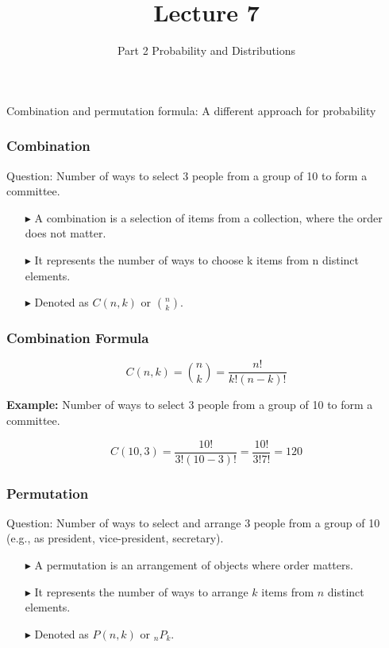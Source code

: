 \documentclass[12pt]{beamer}
\title[ECON2843]{Lecture 7}
\subtitle{Part 2 Probability and Distributions}
\date{}
\begin{document}
	\begin{frame}
		\titlepage
	\end{frame}

	\begin{frame}
	Combination and permutation formula: A different approach for probability
\end{frame}		
		\begin{frame}
			\frametitle{Combination}
			Question: Number of ways to select 3 people from a group of 10 to form a committee.
			
			\begin{itemize}
				\item[\color{blue}$\blacktriangleright$] A combination is a selection of items from a collection, where the order does not matter.
				\item[\color{blue}$\blacktriangleright$] It represents the number of ways to choose k items from n distinct elements.
				\item[\color{blue}$\blacktriangleright$] Denoted as $C(n,k)$ or $\binom{n}{k}$.
			\end{itemize}
			
		\end{frame}
		
		\begin{frame}
			\frametitle{Combination Formula}
			
			\begin{equation*}
				C(n,k) = \binom{n}{k} = \frac{n!}{k!(n-k)!}
			\end{equation*}
			
			\vspace{0.5cm}
			
			\textbf{Example:} Number of ways to select 3 people from a group of 10 to form a committee.
			
			\begin{equation*}
				C(10,3) = \frac{10!}{3!(10-3)!} = \frac{10!}{3!7!} = 120
			\end{equation*}
			
		\end{frame}
		
		\begin{frame}
			\frametitle{Permutation}
			Question: Number of ways to select and arrange 3 people from a group of 10 (e.g., as president, vice-president, secretary).
			\begin{itemize}
				\item[\color{blue}$\blacktriangleright$]A permutation is an arrangement of objects where order matters.
				\item[\color{blue}$\blacktriangleright$]It represents the number of ways to arrange $k$ items from $n$ distinct elements.
				\item[\color{blue}$\blacktriangleright$]Denoted as $P(n,k)$ or $_nP_k$.
			\end{itemize}
			
		\end{frame}
		
\end{document}
